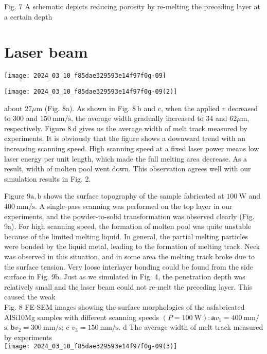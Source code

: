 \documentclass[10pt]{article}
\begin{document}
Fig. 7 A schematic depicts reducing porosity by re-melting the preceding layer at a certain depth

\section*{Laser beam}
\begin{center}
\texttt{[image: 2024\_03\_10\_f85dae329593e14f97f0g-09]}
\end{center}

\begin{center}
\texttt{[image: 2024\_03\_10\_f85dae329593e14f97f0g-09(2)]}
\end{center}

about $27 \mu \mathrm{m}$ (Fig. 8a). As shown in Fig. $8 \mathrm{~b}$ and c, when the applied $v$ decreased to 300 and $150 \mathrm{~mm} / \mathrm{s}$, the average width gradually increased to 34 and $62 \mu \mathrm{m}$, respectively. Figure $8 \mathrm{~d}$ gives us the average width of melt track measured by experiments. It is obviously that the figure shows a downward trend with an increasing scanning speed. High scanning speed at a fixed laser power means low laser energy per unit length, which made the full melting area decrease. As a result, width of molten pool went down. This observation agrees well with our simulation results in Fig. 2.

Figure $9 \mathrm{a}, \mathrm{b}$ shows the surface topography of the sample fabricated at $100 \mathrm{~W}$ and $400 \mathrm{~mm} / \mathrm{s}$. A single-pass scanning was performed on the top layer in our experiments, and the powder-to-solid transformation was observed clearly (Fig. 9a). For high scanning speed, the formation of molten pool was quite unstable because of the limited melting liquid. In general, the partial melting particles were bonded by the liquid metal, leading to the formation of melting track. Neck was observed in this situation, and in some area the melting track broke due to the surface tension. Very loose interlayer bonding could be found from the side surface in Fig. 9b. Just as we simulated in Fig. 4, the penetration depth was relatively small and the laser beam could not re-melt the preceding layer. This caused the weak\\
Fig. 8 FE-SEM images showing the surface morphologies of the asfabricated AlSi10Mg samples with different scanning speeds $(P=100 \mathrm{~W}): \mathbf{a} v_{1}=400 \mathrm{~mm} /$ $\mathrm{s} ; \mathbf{b} v_{2}=300 \mathrm{~mm} / \mathrm{s}$; c $v_{3}=150 \mathrm{~mm} / \mathrm{s}$. d The average width of melt track measured by experiments\\
\texttt{[image: 2024\_03\_10\_f85dae329593e14f97f0g-09(3)]}
\end{document}
